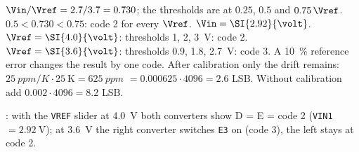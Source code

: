 \begin{solution}
\begin{talist}
\ta $\Vin/\Vref = 2.7/3.7 = 0.730$; the thresholds are at $0.25$, $0.5$ and $0.75\,\Vref$.
	$0.5 < 0.730 < 0.75$: code 2 for every $\Vref$.
\ta $\Vin = \SI{2.92}{\volt}$. $\Vref = \SI{4.0}{\volt}$: thresholds 1, 2, \SI{3}{\volt}: code 2.
	$\Vref = \SI{3.6}{\volt}$: thresholds 0.9, 1.8, \SI{2.7}{\volt}: code 3.
	A \SI{10}{\percent} reference error changes the result by one code.
\ta After calibration only the drift remains: $\SI{25}{ppm/K}\cdot\SI{25}{\kelvin} = \SI{625}{ppm}$
	$= 0.000625\cdot 4096 = 2.6$ LSB. Without calibration add $0.002\cdot 4096 = 8.2$ LSB.
\item[] : with the \texttt{VREF} slider at \SI{4.0}{\volt} both converters show
	D = E = code 2 (\texttt{VIN1} $=\SI{2.92}{\volt}$); at \SI{3.6}{\volt} the right converter switches \texttt{E3} on (code 3), the left stays at code 2.
\end{talist}
\end{solution}


